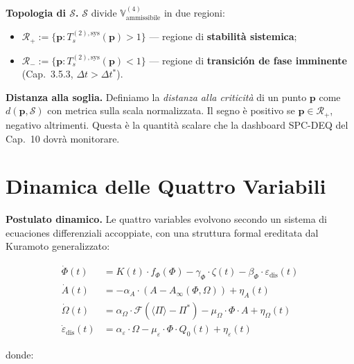 \Hypoth{} \textbf{Topologia di \(\mathcal{S}\).} \(\mathcal{S}\) divide
\(\mathbb{V}^{(4)}_{\text{ammissibile}}\) in due regioni:

\begin{itemize}
\tightlist
\item
  \(\mathcal{R}_+ := \{\boldsymbol{p} : T_s^{(2),\text{sys}}(\boldsymbol{p}) > 1\}\)
  --- regione di \textbf{stabilità sistemica};
\item
  \(\mathcal{R}_- := \{\boldsymbol{p} : T_s^{(2),\text{sys}}(\boldsymbol{p}) < 1\}\)
  --- regione di \textbf{transición de fase imminente} (Cap.~3.5.3,
  \(\Delta t > \Delta t^*\)).
\end{itemize}

\Hypoth{} \textbf{Distanza alla soglia.} Definiamo la \emph{distanza
alla criticità} di un punto \(\boldsymbol{p}\) come
\(d(\boldsymbol{p}, \mathcal{S})\) con metrica sulla scala normalizzata.
Il segno è positivo se \(\boldsymbol{p} \in \mathcal{R}_+\), negativo
altrimenti. Questa è la quantità scalare che la dashboard SPC-DEQ del
Cap.~10 dovrà monitorare.



\section{Dinamica delle Quattro
Variabili}\label{dinamica-delle-quattro-variables}

\Hypoth{} \textbf{Postulato dinamico.} Le quattro variables evolvono
secondo un sistema di ecuaciones differenziali accoppiate, con una
struttura formal ereditata dal Kuramoto generalizzato:

\[
\begin{aligned}
\dot{\Phi}(t) &= K(t) \cdot f_\Phi(\Phi) - \gamma_\Phi \cdot \zeta(t) - \beta_\Phi \cdot \varepsilon_{\text{dis}}(t) \\
\dot{A}(t) &= -\alpha_A \cdot (A - A_\infty(\Phi, \Omega)) + \eta_A(t) \\
\dot{\Omega}(t) &= \alpha_\Omega \cdot \mathcal{F}(\langle\Pi\rangle - \Pi^*) - \mu_\Omega \cdot \Phi \cdot A + \eta_\Omega(t) \\
\dot{\varepsilon}_{\text{dis}}(t) &= \alpha_\varepsilon \cdot \Omega - \mu_\varepsilon \cdot \Phi \cdot Q_0(t) + \eta_\varepsilon(t)
\end{aligned}
\]

donde:

